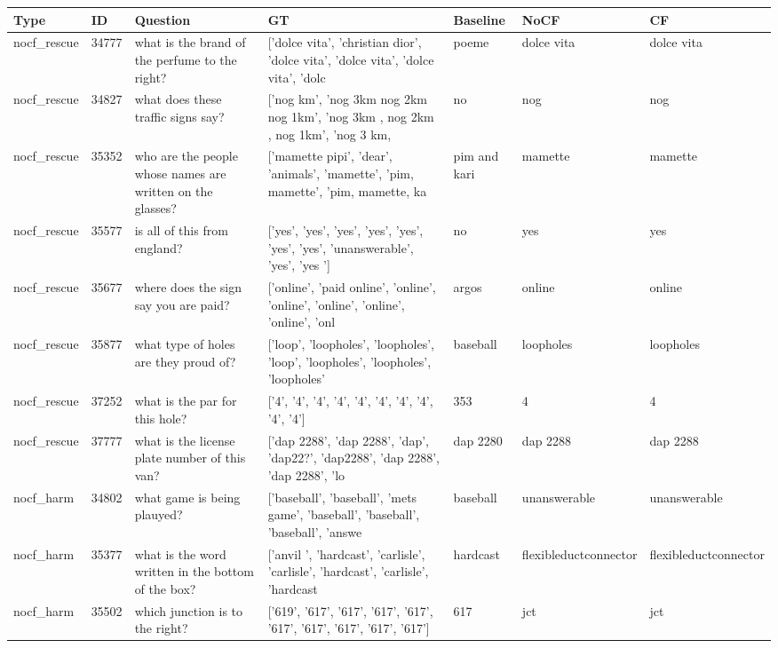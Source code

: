 \begin{table}[t]
\centering
\begin{tabular}{llp{4.2cm}p{2.1cm}p{2.1cm}p{2.1cm}p{2.1cm}}
\toprule
Type & ID & Question & GT & Baseline & NoCF & CF \\
\midrule
nocf\_rescue & 34777 & what is the brand of the perfume to the right? & ['dolce vita', 'christian dior', 'dolce vita', 'dolce vita', 'dolce vita', 'dolc & poeme & dolce vita & dolce vita \\
nocf\_rescue & 34827 & what does these traffic signs say? & ['nog km', 'nog 3km nog 2km nog 1km', 'nog 3km , nog 2km , nog 1km', 'nog 3 km,  & no & nog & nog \\
nocf\_rescue & 35352 & who are the people whose names are written on the glasses? & ['mamette pipi', 'dear', 'animals', 'mamette', 'pim, mamette', 'pim, mamette, ka & pim and kari & mamette & mamette \\
nocf\_rescue & 35577 & is all of this from england? & ['yes', 'yes', 'yes', 'yes', 'yes', 'yes', 'yes', 'unanswerable', 'yes', 'yes '] & no & yes & yes \\
nocf\_rescue & 35677 & where does the sign say you are paid? & ['online', 'paid online', 'online', 'online', 'online', 'online', 'online', 'onl & argos & online & online \\
nocf\_rescue & 35877 & what type of holes are they proud of? & ['loop', 'loopholes', 'loopholes', 'loop', 'loopholes', 'loopholes', 'loopholes' & baseball & loopholes & loopholes \\
nocf\_rescue & 37252 & what is the par for this hole? & ['4', '4', '4', '4', '4', '4', '4', '4', '4', '4'] & 353 & 4 & 4 \\
nocf\_rescue & 37777 & what is the license plate number of this van? & ['dap 2288', 'dap 2288', 'dap', 'dap22?', 'dap2288', 'dap 2288', 'dap 2288', 'lo & dap 2280 & dap 2288 & dap 2288 \\
nocf\_harm & 34802 & what game is being plauyed? & ['baseball', 'baseball', 'mets game', 'baseball', 'baseball', 'baseball', 'answe & baseball & unanswerable & unanswerable \\
nocf\_harm & 35377 & what is the word written in the bottom of the box? & ['anvil ', 'hardcast', 'carlisle', 'carlisle', 'hardcast', 'carlisle', 'hardcast & hardcast & flexibleductconnector & flexibleductconnector \\
nocf\_harm & 35502 & which junction is to the right? & ['619', '617', '617', '617', '617', '617', '617', '617', '617', '617'] & 617 & jct & jct \\

\end{tabular}
\end{table}
